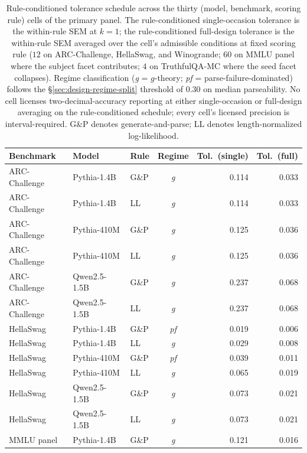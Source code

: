 \documentclass[11pt]{article}
\begin{document}
\begin{table}[h]
\centering
\small
\caption{Rule-conditioned tolerance schedule across the thirty (model, benchmark, scoring rule) cells of the primary panel. The rule-conditioned single-occasion tolerance is the within-rule SEM at $k = 1$; the rule-conditioned full-design tolerance is the within-rule SEM averaged over the cell's admissible conditions at fixed scoring rule ($12$ on ARC-Challenge, HellaSwag, and Winogrande; $60$ on MMLU panel where the subject facet contributes; $4$ on TruthfulQA-MC where the seed facet collapses). Regime classification (\textit{g} = $g$-theory; \textit{pf} = parse-failure-dominated) follows the §\ref{sec:design-regime-split} threshold of $0.30$ on median parseability. No cell licenses two-decimal-accuracy reporting at either single-occasion or full-design averaging on the rule-conditioned schedule; every cell's licensed precision is interval-required. G\&P denotes generate-and-parse; LL denotes length-normalized log-likelihood.}
\label{tab:tolerance-rule-conditioned}
\begin{tabular}{lllcrr}
\toprule
Benchmark & Model & Rule & Regime & Tol.\ (single) & Tol.\ (full) \\
\midrule
ARC-Challenge & Pythia-1.4B  & G\&P & \textit{g}  & 0.114 & 0.033 \\
ARC-Challenge & Pythia-1.4B  & LL   & \textit{g}  & 0.114 & 0.033 \\
ARC-Challenge & Pythia-410M  & G\&P & \textit{g}  & 0.125 & 0.036 \\
ARC-Challenge & Pythia-410M  & LL   & \textit{g}  & 0.125 & 0.036 \\
ARC-Challenge & Qwen2.5-1.5B & G\&P & \textit{g}  & 0.237 & 0.068 \\
ARC-Challenge & Qwen2.5-1.5B & LL   & \textit{g}  & 0.237 & 0.068 \\
HellaSwag     & Pythia-1.4B  & G\&P & \textit{pf} & 0.019 & 0.006 \\
HellaSwag     & Pythia-1.4B  & LL   & \textit{g}  & 0.029 & 0.008 \\
HellaSwag     & Pythia-410M  & G\&P & \textit{pf} & 0.039 & 0.011 \\
HellaSwag     & Pythia-410M  & LL   & \textit{g}  & 0.065 & 0.019 \\
HellaSwag     & Qwen2.5-1.5B & G\&P & \textit{g}  & 0.073 & 0.021 \\
HellaSwag     & Qwen2.5-1.5B & LL   & \textit{g}  & 0.073 & 0.021 \\
MMLU panel    & Pythia-1.4B  & G\&P & \textit{g}  & 0.121 & 0.016 \\

\end{tabular}
\end{table}
\end{document}
